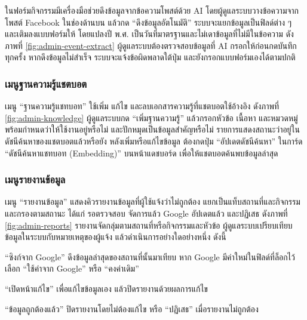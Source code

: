 
ในฟอร์มกิจกรรมมีเครื่องมือช่วยดึงข้อมูลจากข้อความโพสต์ด้วย AI โดยผู้ดูแลระบบวางข้อความจากโพสต์ Facebook ในช่องด้านบน แล้วกด ``ดึงข้อมูลอัตโนมัติ'' ระบบจะแยกข้อมูลเป็นฟิลด์ต่าง ๆ และเติมลงแบบฟอร์มให้ โดยแปลงปี พ.ศ. เป็นวันที่มาตรฐานและไม่เดาข้อมูลที่ไม่มีในข้อความ ดังภาพที่ \ref{fig:admin-event-extract} ผู้ดูแลระบบต้องตรวจสอบข้อมูลที่ AI กรอกให้ก่อนกดบันทึกทุกครั้ง หากดึงข้อมูลไม่สำเร็จ ระบบจะแจ้งข้อผิดพลาดใต้ปุ่ม และยังกรอกแบบฟอร์มเองได้ตามปกติ


\subsubsection{เมนูฐานความรู้แชตบอต}

เมนู ``ฐานความรู้แชทบอท'' ใช้เพิ่ม แก้ไข และลบเอกสารความรู้ที่แชตบอตใช้อ้างอิง ดังภาพที่ \ref{fig:admin-knowledge} ผู้ดูแลระบบกด ``เพิ่มฐานความรู้'' แล้วกรอกหัวข้อ เนื้อหา และหมวดหมู่ พร้อมกำหนดว่าให้ใช้งานอยู่หรือไม่ และปักหมุดเป็นข้อมูลสำคัญหรือไม่ รายการแสดงสถานะว่าอยู่ในดัชนีค้นหาของแชตบอตแล้วหรือยัง หลังเพิ่มหรือแก้ไขข้อมูล ต้องกดปุ่ม ``อัปเดตดัชนีค้นหา'' ในการ์ด ``ดัชนีค้นหาแชทบอท (Embedding)'' บนหน้าแดชบอร์ด เพื่อให้แชตบอตค้นพบข้อมูลล่าสุด


\subsubsection{เมนูรายงานข้อมูล}

เมนู ``รายงานข้อมูล'' แสดงคิวรายงานข้อมูลที่ผู้ใช้แจ้งว่าไม่ถูกต้อง แยกเป็นแท็บสถานที่และกิจกรรม และกรองตามสถานะ ได้แก่ รอตรวจสอบ จัดการแล้ว Google อัปเดตแล้ว และปฏิเสธ ดังภาพที่ \ref{fig:admin-reports} รายงานจัดกลุ่มตามสถานที่หรือกิจกรรมและหัวข้อ ผู้ดูแลระบบเปรียบเทียบข้อมูลในระบบกับหมายเหตุของผู้แจ้ง แล้วดำเนินการอย่างใดอย่างหนึ่ง ดังนี้

\begin{numlist}
\item ``ซิงก์จาก Google'' ดึงข้อมูลล่าสุดของสถานที่นั้นมาเทียบ หาก Google มีค่าใหม่ในฟิลด์ที่ล็อกไว้ เลือก ``ใช้ค่าจาก Google'' หรือ ``คงค่าเดิม''
\item ``เปิดหน้าแก้ไข'' เพื่อแก้ไขข้อมูลเอง แล้วปิดรายงานด้วยผลการแก้ไข
\item ``ข้อมูลถูกต้องแล้ว'' ปิดรายงานโดยไม่ต้องแก้ไข หรือ ``ปฏิเสธ'' เมื่อรายงานไม่ถูกต้อง
\end{numlist}

